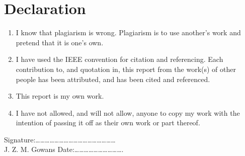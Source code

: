 
\chapter*{Declaration}
\begin{enumerate}
\item I know that plagiarism is wrong. Plagiarism is to use another's work and pretend that it is one's
own.
\item I have used the IEEE convention for citation and referencing. Each contribution to, and quotation in,
this report from the work(s) of other people has been attributed, and has been cited and
referenced.
\item This report is my own work.
\item I have not allowed, and will not allow, anyone to copy my work with the intention of passing it off
as their own work or part thereof.
\end{enumerate}
\vskip 20mm
Signature:\ldots\ldots\ldots\ldots\ldots\ldots\ldots\ldots\ldots\ldots\ldots\ldots\ldots\ldots\ldots\ldots\ldots
\\J. Z. M. Gowans		%
\vskip 20mm
Date:\ldots\ldots\ldots\ldots\ldots\ldots\ldots\ldots\ldots\ldots .


